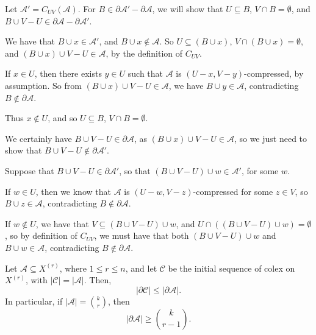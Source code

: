 \documentclass[12pt]{article}
\begin{document}
\begin{proofbox}
	Let $\mathcal{A}' = C_{UV}(\mathcal{A})$. For $B \in \partial \mathcal{A}' - \partial \mathcal{A}$, we will show that $U \subseteq B$, $V \cap B = \emptyset$, and $B \cup V - U \in \partial \mathcal{A} - \partial \mathcal{A}'$.

	We have that $B \cup x \in \mathcal{A}'$, and $B \cup x \not \in \mathcal{A}$. So $U \subseteq (B \cup x)$, $V \cap (B \cup x) = \emptyset$, and $(B \cup x) \cup V - U \in \mathcal{A}$, by the definition of $C_{UV}$.

	If $x \in U$, then there exists $y \in U$ such that $\mathcal{A}$ is $(U-x, V-y)$-compressed, by assumption. So from $(B \cup x) \cup V - U \in \mathcal{A}$, we have $B \cup y \in \mathcal{A}$, contradicting $B \not \in \partial \mathcal{A}$.

	Thus $x \not \in U$, and so $U \subseteq B$, $V \cap B = \emptyset$.

	We certainly have $B \cup V - U \in \partial \mathcal{A}$, as $(B \cup x) \cup V - U \in \mathcal{A}$, so we just need to show that $B \cup V - U \not \in \partial \mathcal{A}'$.

	Suppose that $B \cup V - U \in \partial \mathcal{A}'$, so that $(B \cup V - U) \cup w \in \mathcal{A}'$, for some $w$.

	If $w \in U$, then we know that $\mathcal{A}$ is $(U - w, V - z)$-compressed for some $z \in V$, so $B \cup z \in \mathcal{A}$, contradicting $B \not \in \partial \mathcal{A}$.

	If $w \not \in U$, we have that $V \subseteq (B \cup V - U) \cup w$, and $U \cap ((B \cup V - U) \cup w) = \emptyset$, so by definition of $C_{UV}$, we must have that both $(B \cup V - U) \cup w$ and $B \cup w\in \mathcal{A}$, contradicting $B \not \in \partial \mathcal{A}$.
\end{proofbox}

\begin{theorem}
	Let $\mathcal{A} \subseteq X^{(r)}$, where $1 \leq r \leq n$, and let $\mathcal{C}$ be the initial sequence of colex on $X^{(r)}$, with $|\mathcal{C}| = |\mathcal{A}|$. Then,
	\[
	|\partial \mathcal{C}| \leq |\partial \mathcal{A}|.
	\]
	In particular, if $|\mathcal{A}| = \binom{k}{r}$, then
	\[
		|\partial \mathcal{A}| \geq \binom{k}{r-1}.
	\]
\end{theorem}
\end{document}
